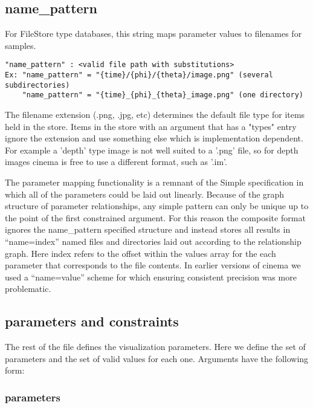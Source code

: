 \documentclass{article}
\begin{document}
\subsection{name\_pattern}

For FileStore type databases, this string maps parameter values to filenames for samples.

\begin{verbatim}
"name_pattern" : <valid file path with substitutions>
Ex: "name_pattern" = "{time}/{phi}/{theta}/image.png" (several subdirectories)
    "name_pattern" = "{time}_{phi}_{theta}_image.png" (one directory)
\end{verbatim}

The filename extension (.png, .jpg, etc) determines the default file type for items held in the store. Items in the store with an argument that has a "types" entry ignore the extension and use something else which is implementation dependent. For example a 'depth' type image is not well suited to a '.png' file, so for depth images cinema is free to use a different format, such as '.im'.

The parameter mapping functionality is a remnant of the Simple specification in which all of the parameters could be laid out linearly. Because of the graph structure of parameter relationships, any simple pattern can only be unique up to the point of the first constrained argument. For this reason the composite format ignores the name\_pattern specified structure and instead stores all results in ``name=index'' named files and directories laid out according to the relationship graph. Here index refers to the offset within the values array for the each parameter that corresponds to the file contents. In earlier versions of cinema we used a ``name=value'' scheme for which ensuring consistent precision was more problematic.

\subsection{parameters and constraints}

The rest of the file defines the visualization parameters. Here we define the set of parameters and the set of valid values for each one. Arguments have the following form:

\subsubsection{parameters}
\end{document}
